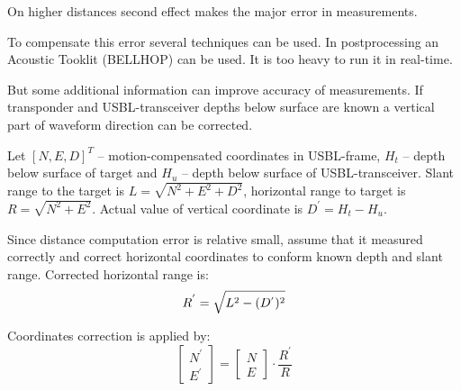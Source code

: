 \documentclass[10pt,letterpaper]{article}
\numberwithin{equation}{section}
\numberwithin{figure}{section}
\numberwithin{table}{section}
\begin{document}
On higher distances second effect makes the major error in measurements.

To compensate this error several techniques can be used. In postprocessing an
Acoustic Tooklit (BELLHOP) can be used. It is too heavy to run it in real-time.

But some additional information can improve accuracy of measurements.
If transponder and USBL-transceiver depths below surface are known a vertical
part of waveform direction can be corrected.

Let $[ N, E, D ]^{T}$ -- motion-compensated coordinates in USBL-frame, $H_{t}$ --
depth below surface of target and $H_{u}$ -- depth below surface of
USBL-transceiver. Slant range to the target is $L = \sqrt{N^2 + E^2 + D^2}$,
horizontal range to target is $R = \sqrt{N^2 + E^2}$. Actual value of vertical
coordinate is $D^{'} = H_{t} - H_{u}$.

Since distance computation error is relative small, assume that it measured
correctly and correct horizontal coordinates to conform known depth and slant range.
Corrected horizontal range is:
\begin{equation}
    R^{'} = \sqrt{L^2 - (D^{'})^2} \\
\end{equation}

Coordinates correction is applied by:
\begin{equation}
    \begin{bmatrix}
        N^{'} \\ E^{'}
    \end{bmatrix} = \begin{bmatrix}
        N \\ E
    \end{bmatrix} \cdot \frac{R^{'}}{R}
\end{equation}


%
%
%
\end{document}
